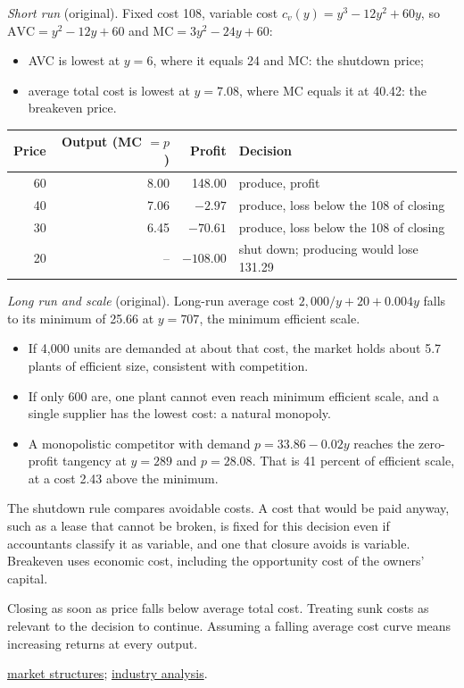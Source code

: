 \begin{qfmethod}
 \emph{Short run} (original). Fixed cost 108, variable cost $c_v(y)=y^3-12y^2+60y$, so $\mathrm{AVC}=y^2-12y+60$ and $\mathrm{MC}=3y^2-24y+60$:
\begin{itemize}
\item AVC is lowest at $y=6$, where it equals 24 and MC: the shutdown price;
\item average total cost is lowest at $y=7.08$, where MC equals it at 40.42: the breakeven price.
\end{itemize}
\begin{center}\small
\begin{tabular}{@{}rrrl@{}}
\toprule
Price & Output (MC $=p$) & Profit & Decision \\
\midrule
60 & 8.00 & 148.00 & produce, profit \\
40 & 7.06 & $-2.97$ & produce, loss below the 108 of closing \\
30 & 6.45 & $-70.61$ & produce, loss below the 108 of closing \\
20 & -- & $-108.00$ & shut down; producing would lose 131.29 \\
\bottomrule
\end{tabular}
\end{center}

\emph{Long run and scale} (original). Long-run average cost $2{,}000/y+20+0.004y$ falls to its minimum of 25.66 at $y=707$, the minimum efficient scale.
\begin{itemize}
\item If 4,000 units are demanded at about that cost, the market holds about 5.7 plants of efficient size, consistent with competition.
\item If only 600 are, one plant cannot even reach minimum efficient scale, and a single supplier has the lowest cost: a natural monopoly.
\item A monopolistic competitor with demand $p=33.86-0.02y$ reaches the zero-profit tangency at $y=289$ and $p=28.08$. That is 41 percent of efficient scale, at a cost 2.43 above the minimum.
\end{itemize}

 The shutdown rule compares avoidable costs. A cost that would be paid anyway, such as a lease that cannot be broken, is fixed for this decision even if accountants classify it as variable, and one that closure avoids is variable. Breakeven uses economic cost, including the opportunity cost of the owners' capital.

 Closing as soon as price falls below average total cost. Treating sunk costs as relevant to the decision to continue. Assuming a falling average cost curve means increasing returns at every output.

 \hyperref[def:market-structures-pricing]{market structures}; \hyperref[meth:industry-analysis]{industry analysis}.

\end{qfmethod}

